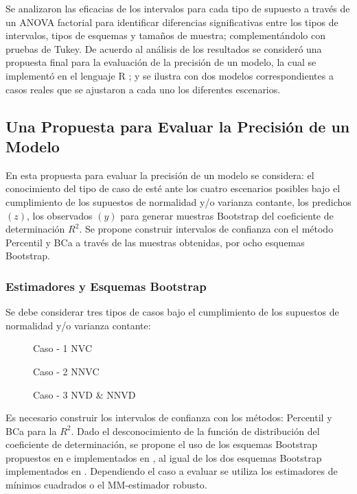 Se analizaron las eficacias de los intervalos para cada tipo de supuesto a través de un ANOVA factorial para identificar diferencias significativas entre los tipos de intervalos, tipos de esquemas y tamaños de muestra; complementándolo con pruebas de Tukey. De acuerdo al análisis de los resultados se consideró una propuesta final para la evaluación de la precisión de un modelo, la cual se implementó en el lenguaje R \parencite{R-2024}; y se ilustra con dos modelos correspondientes a casos reales que se ajustaron a cada uno los diferentes escenarios.




\subsection{Una Propuesta para Evaluar la Precisión de un Modelo}

En esta propuesta para evaluar la precisión de un modelo se considera: el conocimiento del tipo de caso de esté ante los cuatro escenarios posibles bajo el cumplimiento de los supuestos de normalidad y/o varianza contante, los predichos $(z)$, los observados $(y)$ para generar muestras Bootstrap del coeficiente de determinación $R^{2}$. Se propone construir intervalos de confianza con el método Percentil y BCa a través de las muestras obtenidas, por ocho esquemas Bootstrap. \\ 

\subsubsection{Estimadores y Esquemas Bootstrap}

Se debe considerar tres tipos de casos bajo el cumplimiento de los supuestos de normalidad y/o varianza contante:

\begin{description}
	\item[] Caso - 1 NVC
	\item[] Caso - 2 NNVC
	\item[] Caso - 3 NVD \& NNVD
\end{description}


Es necesario construir los intervalos de confianza con los métodos: Percentil y BCa para la $R^{2}$. Dado el desconocimiento de la función de distribución del coeficiente de determinación, se propone el uso de los esquemas Bootstrap propuestos en \textcite{rana-2012} e implementados en \textcite{zacarias-2023}, al igual de los dos esquemas Bootstrap implementados en \textcite{balam-2012}. Dependiendo el caso a evaluar se utiliza los estimadores de mínimos cuadrados o el MM-estimador robusto.\\


